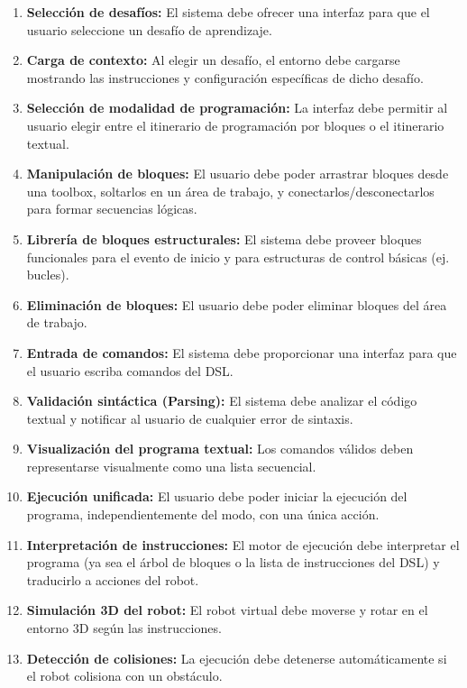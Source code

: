 \begin{enumerate}
  \item[\textbf{RF-001}] \textbf{Selección de desafíos:} El sistema debe ofrecer una interfaz para que el usuario seleccione un desafío de aprendizaje.
	\item[\textbf{RF-002}] \textbf{Carga de contexto:} Al elegir un desafío, el entorno debe cargarse mostrando las instrucciones y configuración específicas de dicho desafío.
	\item[\textbf{RF-003}] \textbf{Selección de modalidad de programación:} La interfaz debe permitir al usuario elegir entre el itinerario de programación por bloques o el itinerario textual.

	\item[\textbf{RF-004}] \textbf{Manipulación de bloques:} El usuario debe poder arrastrar bloques desde una toolbox, soltarlos en un área de trabajo, y conectarlos/desconectarlos para formar secuencias lógicas.
	\item[\textbf{RF-005}] \textbf{Librería de bloques estructurales:} El sistema debe proveer bloques funcionales para el evento de inicio y para estructuras de control básicas (ej. bucles).
	\item[\textbf{RF-006}] \textbf{Eliminación de bloques:} El usuario debe poder eliminar bloques del área de trabajo.
	
	 \item[\textbf{RF-007}] \textbf{Entrada de comandos:} El sistema debe proporcionar una interfaz para que el usuario escriba comandos del DSL.
	\item[\textbf{RF-008}] \textbf{Validación sintáctica (Parsing):} El sistema debe analizar el código textual y notificar al usuario de cualquier error de sintaxis.
	\item[\textbf{RF-009}] \textbf{Visualización del programa textual:} Los comandos válidos deben representarse visualmente como una lista secuencial.
	 \item[\textbf{RF-010}] \textbf{Ejecución unificada:} El usuario debe poder iniciar la ejecución del programa, independientemente del modo, con una única acción.
	\item[\textbf{RF-011}] \textbf{Interpretación de instrucciones:} El motor de ejecución debe interpretar el programa (ya sea el árbol de bloques o la lista de instrucciones del DSL) y traducirlo a acciones del robot.
	\item[\textbf{RF-012}] \textbf{Simulación 3D del robot:} El robot virtual debe moverse y rotar en el entorno 3D según las instrucciones.
	\item[\textbf{RF-013}] \textbf{Detección de colisiones:} La ejecución debe detenerse automáticamente si el robot colisiona con un obstáculo.

\end{enumerate}



